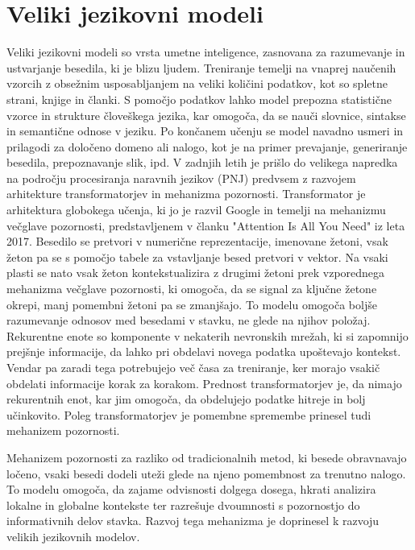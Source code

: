 \documentclass[12pt,a4paper]{book}
\begin{document}
\section{Veliki jezikovni modeli}
Veliki jezikovni modeli so vrsta umetne inteligence, zasnovana za razumevanje in ustvarjanje besedila, ki je blizu ljudem. Treniranje temelji na vnaprej naučenih vzorcih z obsežnim usposabljanjem na veliki količini podatkov, kot so spletne strani, knjige in članki. S pomočjo podatkov lahko model prepozna statistične vzorce in strukture človeškega jezika, kar omogoča, da se nauči slovnice, sintakse in semantične odnose v jeziku. Po končanem učenju se model navadno usmeri in prilagodi za določeno domeno ali nalogo, kot je na primer prevajanje, generiranje besedila, prepoznavanje slik, ipd.
\cite{10.1145/3520312.3534862}
V zadnjih letih je prišlo do velikega napredka na področju procesiranja naravnih jezikov (PNJ) predvsem z razvojem arhitekture transformatorjev in mehanizma pozornosti.
Transformator je arhitektura globokega učenja, ki jo je razvil Google in temelji na mehanizmu večglave pozornosti, predstavljenem v članku "Attention Is All You Need" iz leta 2017.  \cite{datacamp_attention_2024} 
Besedilo se pretvori v numerične reprezentacije, imenovane žetoni, vsak žeton pa se s pomočjo tabele za vstavljanje besed pretvori v vektor. Na vsaki plasti se nato vsak žeton kontekstualizira z drugimi žetoni prek vzporednega mehanizma večglave pozornosti, ki omogoča, da se signal za ključne žetone okrepi, manj pomembni žetoni pa se zmanjšajo. To modelu omogoča boljše razumevanje odnosov med besedami v stavku, ne glede na njihov položaj.
Rekurentne enote so komponente v nekaterih nevronskih mrežah, ki si zapomnijo prejšnje informacije, da lahko pri obdelavi novega podatka upoštevajo kontekst. Vendar pa zaradi tega potrebujejo več časa za treniranje, ker morajo vsakič obdelati informacije korak za korakom.
Prednost transformatorjev je, da nimajo rekurentnih enot, kar jim omogoča, da obdelujejo podatke hitreje in bolj učinkovito. Poleg transformatorjev je pomembne spremembe prinesel tudi mehanizem pozornosti.
\cite{NIPS2017_3f5ee243}

Mehanizem pozornosti za razliko od tradicionalnih metod, ki besede obravnavajo ločeno, vsaki besedi dodeli uteži glede na njeno pomembnost za trenutno nalogo. To modelu omogoča, da zajame odvisnosti dolgega dosega, hkrati analizira lokalne in globalne kontekste ter razrešuje dvoumnosti s pozornostjo do informativnih delov stavka. Razvoj tega mehanizma je doprinesel k razvoju velikih jezikovnih modelov.
\cite{datacamp_attention_2024}
\cite{KASNECI2023102274}
\end{document}
